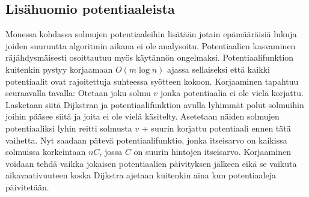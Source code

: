 \documentclass[a4paper, 11pt]{article}
\begin{document}
\subsection*{Lisähuomio potentiaaleista}
Monessa kohdassa solmujen potentiaaleihin lisätään jotain epämääräisiä lukuja joiden suuruutta
algoritmin aikana ei ole analysoitu. Potentiaalien kasvaminen räjähdysmäisesti osoittautuu
myös käytännön ongelmaksi. Potentiaalifunktion kuitenkin pystyy korjaamaan $O(m \log n)$ ajassa
sellaiseksi että kaikki potentiaalit ovat rajoitettuja suhteessa syötteen kokoon.
Korjaaminen tapahtuu seuraavalla tavalla: Otetaan joku solmu $v$ jonka potentiaalia 
ei ole vielä korjattu. Lasketaan siitä
Dijkstran ja potentiaalifunktion avulla lyhimmät polut solmuihin joihin pääsee siitä ja joita ei ole
vielä käsitelty. Asetetaan näiden solmujen potentiaaliksi lyhin reitti solmusta $v$ + 
suurin korjattu potentiaali ennen tätä vaihetta. Nyt saadaan pätevä potentiaalifunktio, jonka
itseisarvo on kaikissa solmuissa korkeintaan $nC$, jossa $C$ on suurin hintojen itseisarvo. Korjaaminen
voidaan tehdä vaikka jokaisen potentiaalien päivityksen jälkeen eikä se vaikuta aikavaativuuteen koska
Dijkstra ajetaan kuitenkin aina kun potentiaaleja päivitetään.
\end{document}
